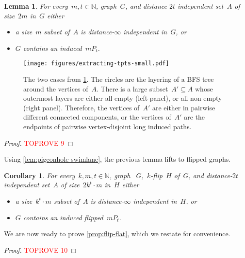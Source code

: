 \documentclass[11pt]{article}      \usepackage[margin=1in]{geometry}  \usepackage{microtype}
\newtheorem{corollary}[theorem]{Corollary}
\newtheorem{lemma}[theorem]{Lemma}
\theoremstyle{definition}
\newcommand{\N}[0]{\mathrm{\mathbb{N}}}
\begin{document}
\begin{lemma}\label{lem:flat-or-pattern}
  For every~$m,t\in\N$, graph~$G$, and distance-$2t$ independent set~$A$ of size~$2m$ in~$G$ either
  \begin{itemize}
    \item a size~$m$ subset of~$A$ is distance-$\infty$ independent in~$G$, or
    \item $G$ contains an induced~$mP_t$.
  \end{itemize}
  
\end{lemma}

\begin{figure}[htbp]
  \centering
  \texttt{[image: figures/extracting-tpts-small.pdf]}
  \caption{The two cases from \cref{lem:flat-or-pattern}.
  The circles are the layering of a BFS tree around the vertices of~$A$.
  There is a large subset~$A'\subseteq A$ whose outermost layers are either all empty (left panel), or all non-empty (right panel).
  Therefore, the vertices of~$A'$ are either in pairwise different connected components, or the vertices of~$A'$ are the endpoints of pairwise vertex-disjoint long induced paths.
  }
  \label{fig:flat-or-pattern}
\end{figure}

\begin{proof}\textcolor{red}{TOPROVE 9}\end{proof}



Using \cref{lem:pigeonhole-swimlane}, the previous lemma lifts to flipped graphs.

\begin{corollary}\label{cor:infty-flip-flat-engine}
  For every~$k,m,t \in \N$, graph 
 ~$G$,~$k$-flip~$H$ of~$G$, and distance-$2t$ independent set~$A$ of size~$2k^t \cdot m$ in~$H$ either 
  \begin{itemize}
    \item a size~$k^t \cdot m$ subset of~$A$ is distance-$\infty$ independent in~$H$, or
    \item $G$ contains an induced flipped~$mP_t$.
  \end{itemize}
\end{corollary}

We are now ready to prove \cref{prop:flip-flat}, which we restate for convenience.

\propFlipFlat*

\begin{proof}\textcolor{red}{TOPROVE 10}\end{proof} 
\end{document}
